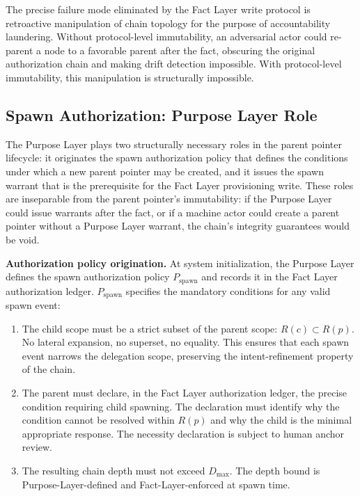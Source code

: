 The precise failure mode eliminated by the Fact Layer write protocol is retroactive manipulation of chain topology for the purpose of accountability laundering. Without protocol-level immutability, an adversarial actor could re-parent a node to a favorable parent after the fact, obscuring the original authorization chain and making drift detection impossible. With protocol-level immutability, this manipulation is structurally impossible.

\subsection{Spawn Authorization: Purpose Layer Role}
\label{sec:purpose-layer-spawn-authorization}

The Purpose Layer plays two structurally necessary roles in the parent pointer lifecycle: it originates the spawn authorization policy that defines the conditions under which a new parent pointer may be created, and it issues the spawn warrant that is the prerequisite for the Fact Layer provisioning write. These roles are inseparable from the parent pointer's immutability: if the Purpose Layer could issue warrants after the fact, or if a machine actor could create a parent pointer without a Purpose Layer warrant, the chain's integrity guarantees would be void.

\medskip
\noindent\textbf{Authorization policy origination.} At system initialization, the Purpose Layer defines the spawn authorization policy $P_{\mathrm{spawn}}$ and records it in the Fact Layer authorization ledger. $P_{\mathrm{spawn}}$ specifies the mandatory conditions for any valid spawn event:

\begin{enumerate}
\item[(S1) \textbf{Scope refinement.}] The child scope must be a strict subset of the parent scope: $R(c) \subset R(p)$. No lateral expansion, no superset, no equality. This ensures that each spawn event narrows the delegation scope, preserving the intent-refinement property of the chain.

\item[(S2) \textbf{Operational necessity.}] The parent must declare, in the Fact Layer authorization ledger, the precise condition requiring child spawning. The declaration must identify why the condition cannot be resolved within $R(p)$ and why the child is the minimal appropriate response. The necessity declaration is subject to human anchor review.

\item[(S3) \textbf{Depth within bound.}] The resulting chain depth must not exceed $D_{\max}$. The depth bound is Purpose-Layer-defined and Fact-Layer-enforced at spawn time.
\end{enumerate}

